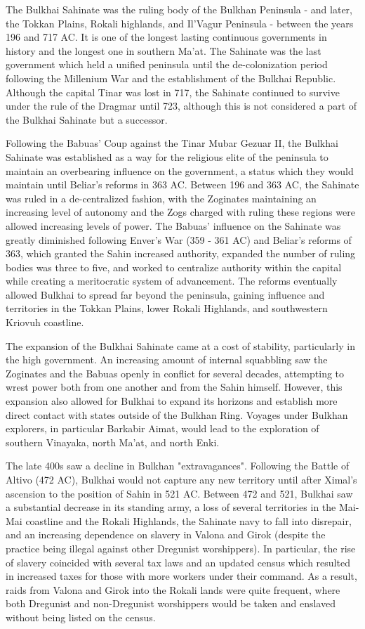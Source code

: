 	The Bulkhai Sahinate was the ruling body of the Bulkhan Peninsula - and later, the Tokkan Plains, Rokali highlands, and Il'Vagur Peninsula - between the years 196 and 717 AC. It is one of the longest lasting continuous governments in history and the longest one in southern Ma'at. The Sahinate was the last government which held a unified peninsula until the de-colonization period following the Millenium War and the establishment of the Bulkhai Republic. Although the capital Tinar was lost in 717, the Sahinate continued to survive under the rule of the Dragmar until 723, although this is not considered a part of the Bulkhai Sahinate but a successor.
	
	Following the Babuas' Coup against the Tinar Mubar Gezuar II, the Bulkhai Sahinate was established as a way for the religious elite of the peninsula to maintain an overbearing influence on the government, a status which they would maintain until Beliar's reforms in 363 AC. Between 196 and 363 AC, the Sahinate was ruled in a de-centralized fashion, with the Zoginates maintaining an increasing level of autonomy and the Zogs charged with ruling these regions were allowed increasing levels of power. The Babuas' influence on the Sahinate was greatly diminished following Enver's War (359 - 361 AC) and Beliar's reforms of 363, which granted the Sahin increased authority, expanded the number of ruling bodies was three to five, and worked to centralize authority within the capital while creating a meritocratic system of advancement. The reforms eventually allowed Bulkhai to spread far beyond the peninsula, gaining influence and territories in the Tokkan Plains, lower Rokali Highlands, and southwestern Kriovuh coastline.
	
	The expansion of the Bulkhai Sahinate came at a cost of stability, particularly in the high government. An increasing amount of internal squabbling saw the Zoginates and the Babuas openly in conflict for several decades, attempting to wrest power both from one another and from the Sahin himself. However, this expansion also allowed for Bulkhai to expand its horizons and establish more direct contact with states outside of the Bulkhan Ring. Voyages under Bulkhan explorers, in particular Barkabir Aimat, would lead to the exploration of southern Vinayaka, north Ma'at, and north Enki. 
	
	The late 400s saw a decline in Bulkhan "extravagances". Following the Battle of Altivo (472 AC), Bulkhai would not capture any new territory until after Ximal's ascension to the position of Sahin in 521 AC. Between 472 and 521, Bulkhai saw a substantial decrease in its standing army, a loss of several territories in the Mai-Mai coastline and the Rokali Highlands, the Sahinate navy to fall into disrepair, and an increasing dependence on slavery in Valona and Girok (despite the practice being illegal against other Dregunist worshippers). In particular, the rise of slavery coincided with several tax laws and an updated census which resulted in increased taxes for those with more workers under their command. As a result, raids from Valona and Girok into the Rokali lands were quite frequent, where both Dregunist and non-Dregunist worshippers would be taken and enslaved without being listed on the census.
	
